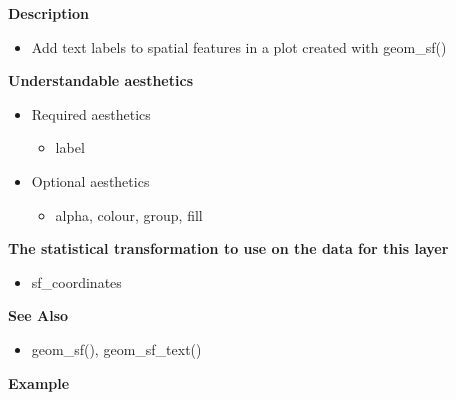 \documentclass[
  letterpaper,
  DIV=11,
  numbers=noendperiod]{scrreprt}
\providecommand{\tightlist}{%
  \setlength{\itemsep}{0pt}\setlength{\parskip}{0pt}}\usepackage{longtable,booktabs,array}
\begin{document}
\textbf{Description}

\begin{itemize}
\tightlist
\item
  Add text labels to spatial features in a plot created with geom\_sf()
\end{itemize}

\textbf{Understandable aesthetics}

\begin{itemize}
\tightlist
\item
  Required aesthetics

  \begin{itemize}
  \tightlist
  \item
    label
  \end{itemize}
\item
  Optional aesthetics

  \begin{itemize}
  \tightlist
  \item
    alpha, colour, group, fill
  \end{itemize}
\end{itemize}

\textbf{The statistical transformation to use on the data for this
layer}

\begin{itemize}
\tightlist
\item
  sf\_coordinates
\end{itemize}

\textbf{See Also}

\begin{itemize}
\tightlist
\item
  geom\_sf(), geom\_sf\_text()
\end{itemize}

\textbf{Example}
\end{document}
